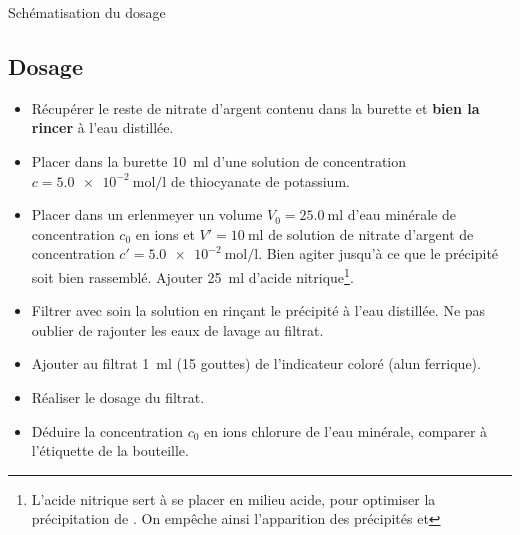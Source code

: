 \documentclass{tp}
\begin{document}
Schématisation du dosage
\begin{center}
\end{center}

\subsection{Dosage}%
\label{sub:dosage}

\begin{itemize}
  \item Récupérer le reste de nitrate d'argent contenu dans la burette et \textbf{bien la rincer} à l'eau distillée.

  \item Placer dans la burette \SI{10}{\milli\litre} d'une solution de concentration $c = \SI{5.0e-2}{\mol\per\litre}$ de thiocyanate de potassium.  

  \item Placer dans un erlenmeyer un volume $V_0 = \SI{25.0}{\milli\litre}$ d'eau minérale de concentration $c_0$ en ions  et $V'= \SI{10}{\milli\litre}$ de solution de nitrate d'argent de concentration $c'= \SI{5.0e-2}{\mol\per\litre}$. Bien agiter jusqu'à ce que le précipité soit bien rassemblé. Ajouter \SI{25}{\milli\litre} d'acide nitrique\footnote{L'acide nitrique sert à se placer en milieu acide, pour optimiser la précipitation de . On empêche ainsi l'apparition des précipités  et }.

\item Filtrer avec soin la solution en rinçant le précipité à l'eau distillée. Ne pas oublier de rajouter les eaux de lavage au filtrat.

\item Ajouter au filtrat \SI{1}{\milli\litre} (15 gouttes) de l'indicateur coloré (alun ferrique).

\item Réaliser le dosage du filtrat.

\item Déduire la concentration $c_0$ en ions chlorure de l'eau minérale, comparer à l'étiquette de la bouteille.

\end{itemize}
\end{document}
